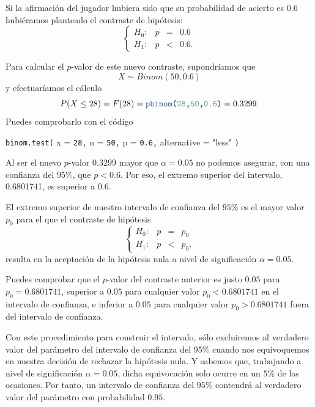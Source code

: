 \documentclass[
  notoc,
  nobib,
  degree=inf]{mnye}
\newenvironment{Shaded}{\begin{snugshade}}{\end{snugshade}}
\newcommand{\AttributeTok}[1]{\textcolor[rgb]{0.77,0.63,0.00}{#1}}
\newcommand{\DecValTok}[1]{\textcolor[rgb]{0.00,0.00,0.81}{#1}}
\newcommand{\FloatTok}[1]{\textcolor[rgb]{0.00,0.00,0.81}{#1}}
\newcommand{\FunctionTok}[1]{\textcolor[rgb]{0.00,0.00,0.00}{#1}}
\newcommand{\KeywordTok}[1]{\textcolor[rgb]{0.13,0.29,0.53}{\textbf{#1}}}
\newcommand{\NormalTok}[1]{#1}
\newcommand{\StringTok}[1]{\textcolor[rgb]{0.31,0.60,0.02}{#1}}
\renewcommand{\DecValTok}[1]{\textcolor[RGB]{64, 160, 112}{\texttt{#1}}}
\renewcommand{\FloatTok}[1]{\textcolor[RGB]{64, 160, 112}{\texttt{#1}}}
\renewcommand{\FunctionTok}[1]{\textcolor[rgb]{0.13,0.29,0.53}{\texttt{#1}}}
\renewcommand{\KeywordTok}[1]{\textcolor[rgb]{0.13,0.29,0.53}{\texttt{#1}}}
\renewcommand{\NormalTok}[1]{\texttt{#1}}
\begin{document}
Si la afirmación del jugador hubiera sido que su probabilidad de acierto es \(0.6\) hubiéramos planteado el contraste de hipótesis:
\[
  \left\{
  \begin{array}{lrcl}
    H_0:&p&=&0.6\\
    H_1:&p&<&0.6.
  \end{array}
  \right.
\]

Para calcular el \(p\)-valor de este nuevo contraste, supondríamos que \[X\sim Binom(50,0.6)\] y efectuaríamos el cálculo
\[
    P(X\le 28) = F(28) = \KeywordTok{pbinom}\NormalTok{(}\DecValTok{28}\NormalTok{,}\DecValTok{50}\NormalTok{,}\DecValTok{0.6}\NormalTok{)} =0.3299.
\]
Puedes comprobarlo con el código

\begin{Shaded}
\begin{Highlighting}[]
\FunctionTok{binom.test}\NormalTok{(}
  \AttributeTok{x =} \DecValTok{28}\NormalTok{,}
  \AttributeTok{n =} \DecValTok{50}\NormalTok{,}
  \AttributeTok{p =} \FloatTok{0.6}\NormalTok{,}
  \AttributeTok{alternative =} \StringTok{"less"}
\NormalTok{)}
\end{Highlighting}
\end{Shaded}

Al ser el nuevo \(p\)-valor 0.3299 mayor que \(\alpha = 0.05\) no podemos asegurar, con una confianza del \(95\%\), que \(p<0.6\). Por eso, el extremo superior del intervalo, 0.6801741, es superior a \(0.6\).

El extremo superior de nuestro intervalo de confianza del \(95\%\) es el mayor valor \(p_{0}\) para el que el contraste de hipótesis
\[
  \left\{
  \begin{array}{lrcl}
    H_0:&p&=&p_{0}\\
    H_1:&p&<&p_{0}.
  \end{array}
  \right.
\]
resulta en la aceptación de la hipótesis nula a nivel de significación \(\alpha = 0.05\).

Puedes comprobar que el \(p\)-valor del contraste anterior es justo \(0.05\) para \(p_0 = 0.6801741\), superior a \(0.05\) para cualquier valor \(p_0<0.6801741\) en el intervalo de confianza, e inferior a \(0.05\) para cualquier valor \(p_0>0.6801741\) fuera del intervalo de confianza.

Con este procedimiento para construir el intervalo, sólo excluiremos al verdadero valor del parámetro del intervalo de confianza del \(95\%\) cuando nos equivoquemos en nuestra decisión de rechazar la hipótesis nula. Y sabemos que, trabajando a nivel de significación \(\alpha=0.05\), dicha equivocación solo ocurre en un \(5\%\) de las ocasiones. Por tanto, un intervalo de confianza del \(95\%\) contendrá al verdadero valor del parámetro con probabilidad \(0.95\).
\end{document}
